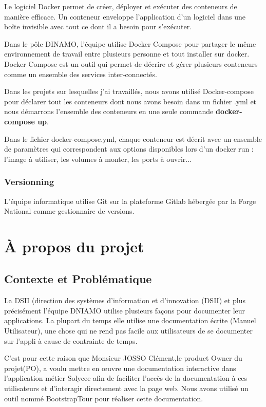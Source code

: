 \documentclass[12pt]{article}
\begin{document}
Le logiciel Docker permet de créer, déployer et exécuter des conteneurs de manière efficace. Un conteneur enveloppe l’application d’un logiciel dans une boîte invisible avec tout ce dont il a besoin pour s’exécuter.


Dans le pôle DINAMO, l'équipe utilise Docker Compose pour partager le même environnement de travail entre plusieurs personne et tout installer sur docker. Docker Compose est un outil qui permet de décrire et gérer  plusieurs conteneurs comme un ensemble des services inter-connectés.

Dans les projets sur lesquelles j'ai travaillés, nous avons utilisé Docker-compose pour déclarer tout les conteneurs dont nous avons besoin dans un fichier .yml  et nous démarrons l'ensemble des conteneurs en une seule commande \textbf{docker-compose up}. 

Dans le fichier docker-compose.yml, chaque conteneur est décrit avec un ensemble de paramètres qui correspondent aux options disponibles lors d’un docker run : l’image à utiliser, les volumes à monter, les ports à ouvrir...
 

\subsubsection{Versionning}

L'équipe informatique utilise Git sur la plateforme Gitlab hébergée par la Forge National comme gestionnaire de versions. 

\section{À propos du projet}

\subsection{Contexte et Problématique}

La DSII (direction des systèmes d'information et d'innovation (DSII) et plus précisément l'équipe DNIAMO utilise plusieurs façons pour documenter leur applications. La plupart du temps elle utilise une documentation écrite (Manuel Utilisateur), une chose qui ne rend pas facile aux utilisateurs de se documenter sur l'appli à cause de contrainte de temps. 


C'est pour cette raison que Monsieur JOSSO Clément,le product Owner du projet(PO), a voulu mettre en œuvre une documentation interactive dans l'application métier Solycee afin de faciliter l’accès de la documentation à ces utilisateurs et d'interagir directement avec la page web. Nous avons utilisé un outil nommé BootstrapTour pour réaliser cette documentation. 
\end{document}

